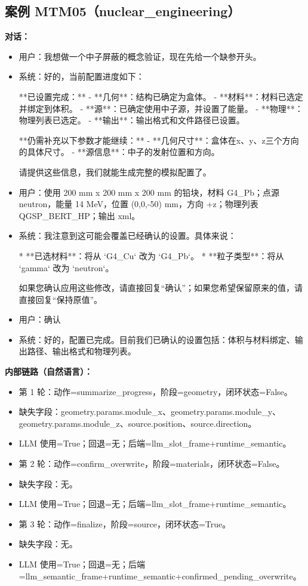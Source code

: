 \documentclass[11pt]{ctexart}
\begin{document}
\subsection{案例 MTM05（nuclear\_engineering）}
\textbf{对话：}
\begin{itemize}
\item 用户：我想做一个中子屏蔽的概念验证，现在先给一个缺参开头。
\item 系统：好的，当前配置进度如下：

**已设置完成：**
- **几何**：结构已确定为盒体。
- **材料**：材料已选定并绑定到体积。
- **源**：已确定使用中子源，并设置了能量。
- **物理**：物理列表已选定。
- **输出**：输出格式和文件路径已设置。

**仍需补充以下参数才能继续：**
- **几何尺寸**：盒体在x、y、z三个方向的具体尺寸。
- **源信息**：中子的发射位置和方向。

请提供这些信息，我们就能生成完整的模拟配置了。
\item 用户：使用 200 mm x 200 mm x 200 mm 的铅块，材料 G4\_Pb；点源 neutron，能量 14 MeV，位置 (0,0,-50) mm，方向 +z；物理列表 QGSP\_BERT\_HP；输出 xml。
\item 系统：我注意到这可能会覆盖已经确认的设置。具体来说：

*   **已选材料**：将从 `G4\_Cu` 改为 `G4\_Pb`。
*   **粒子类型**：将从 `gamma` 改为 `neutron`。

如果您确认应用这些修改，请直接回复“确认”；如果您希望保留原来的值，请直接回复“保持原值”。
\item 用户：确认
\item 系统：好的，配置已完成。目前我们已确认的设置包括：体积与材料绑定、输出路径、输出格式和物理列表。
\end{itemize}
\textbf{内部链路（自然语言）：}
\begin{itemize}
\item 第 1 轮：动作=summarize\_progress，阶段=geometry，闭环状态=False。
\item 缺失字段：geometry.params.module\_x、geometry.params.module\_y、geometry.params.module\_z、source.position、source.direction。
\item LLM 使用=True；回退=无；后端=llm\_slot\_frame+runtime\_semantic。
\item 第 2 轮：动作=confirm\_overwrite，阶段=materials，闭环状态=False。
\item 缺失字段：无。
\item LLM 使用=True；回退=无；后端=llm\_slot\_frame+runtime\_semantic。
\item 第 3 轮：动作=finalize，阶段=source，闭环状态=True。
\item 缺失字段：无。
\item LLM 使用=True；回退=无；后端=llm\_semantic\_frame+runtime\_semantic+confirmed\_pending\_overwrite。
\end{itemize}
\end{document}
